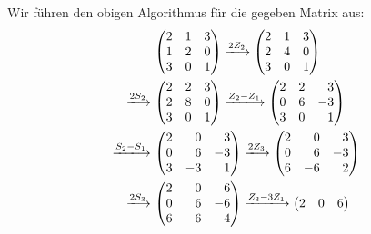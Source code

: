 Wir führen den obigen Algorithmus für die gegeben Matrix aus:
\begin{align*}
  &\,
  \begin{pmatrix}
    2 & 1 & 3 \\ 
    1 & 2 & 0 \\
    3 & 0 & 1 \\
  \end{pmatrix}
  \xlongrightarrow{2 Z_2}
  \begin{pmatrix}
    2 & 1 & 3 \\ 
    2 & 4 & 0 \\
    3 & 0 & 1 \\
  \end{pmatrix}
  \\
  \xlongrightarrow{2 S_2}&\,
  \begin{pmatrix}
    2 & 2 & 3 \\ 
    2 & 8 & 0 \\
    3 & 0 & 1 \\
  \end{pmatrix}
  \xlongrightarrow{Z_2 - Z_1}
  \begin{pmatrix*}[r]
    2 & 2 &  3  \\ 
    0 & 6 & -3  \\
    3 & 0 &  1  \\
  \end{pmatrix*}
  \\
  \xlongrightarrow{S_2 - S_1}&\,
  \begin{pmatrix*}[r]
    2 &  0  &  3  \\ 
    0 &  6  & -3  \\
    3 & -3  &  1  \\
  \end{pmatrix*}
  \xlongrightarrow{2 Z_3}
  \begin{pmatrix*}[r]
    2 &  0  &  3  \\ 
    0 &  6  & -3  \\
    6 & -6  &  2  \\
  \end{pmatrix*}
  \\
  \xlongrightarrow{2 S_3}&\,
  \begin{pmatrix*}[r]
    2 &  0  &  6  \\ 
    0 &  6  & -6  \\
    6 & -6  &  4  \\
  \end{pmatrix*}
  \xlongrightarrow{Z_3 - 3 Z_1}
  \begin{pmatrix*}[r]
    2 &  0  &   6 \\ 

\end{pmatrix*}
\end{align*}
